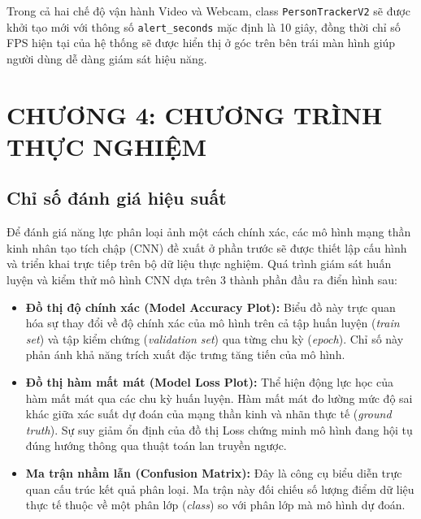 \documentclass[a4paper,12pt]{article}
\begin{document}
Trong cả hai chế độ vận hành Video và Webcam, class \texttt{PersonTrackerV2} sẽ được khởi tạo mới với thông số \texttt{alert\_seconds} mặc định là 10 giây, đồng thời chỉ số FPS hiện tại của hệ thống sẽ được hiển thị ở góc trên bên trái màn hình giúp người dùng dễ dàng giám sát hiệu năng.

\newpage
\section{CHƯƠNG 4: CHƯƠNG TRÌNH THỰC NGHIỆM}
\subsection{Chỉ số đánh giá hiệu suất}
Để đánh giá năng lực phân loại ảnh một cách chính xác, các mô hình mạng thần kinh nhân tạo tích chập (CNN) đề xuất ở phần trước sẽ được thiết lập cấu hình và triển khai trực tiếp trên bộ dữ liệu thực nghiệm. Quá trình giám sát huấn luyện và kiểm thử mô hình CNN dựa trên 3 thành phần đầu ra điển hình sau:

\begin{itemize}
    \item \textbf{Đồ thị độ chính xác (Model Accuracy Plot):} Biểu đồ này trực quan hóa sự thay đổi về độ chính xác của mô hình trên cả tập huấn luyện (\textit{train set}) và tập kiểm chứng (\textit{validation set}) qua từng chu kỳ (\textit{epoch}). Chỉ số này phản ánh khả năng trích xuất đặc trưng tăng tiến của mô hình.
    
    \item \textbf{Đồ thị hàm mất mát (Model Loss Plot):} Thể hiện động lực học của hàm mất mát qua các chu kỳ huấn luyện. Hàm mất mát đo lường mức độ sai khác giữa xác suất dự đoán của mạng thần kinh và nhãn thực tế (\textit{ground truth}). Sự suy giảm ổn định của đồ thị Loss chứng minh mô hình đang hội tụ đúng hướng thông qua thuật toán lan truyền ngược.
    
    \item \textbf{Ma trận nhầm lẫn (Confusion Matrix):} Đây là công cụ biểu diễn trực quan cấu trúc kết quả phân loại. Ma trận này đối chiếu số lượng điểm dữ liệu thực tế thuộc về một phân lớp (\textit{class}) so với phân lớp mà mô hình dự đoán. 
\end{itemize}
\end{document}
